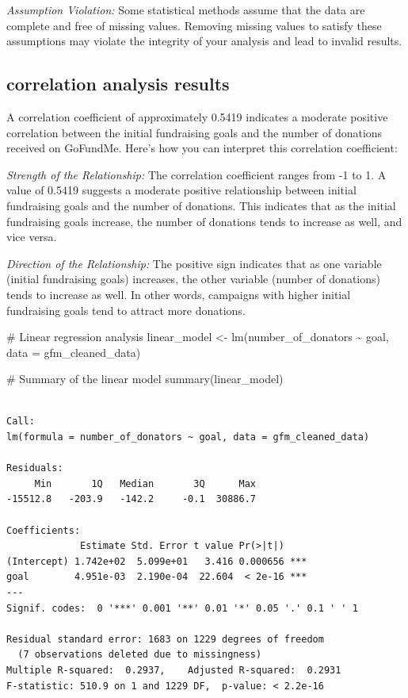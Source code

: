 \documentclass[
  letterpaper,
  DIV=11,
  numbers=noendperiod]{scrartcl}
\newenvironment{Shaded}{\begin{snugshade}}{\end{snugshade}}
\newcommand{\AttributeTok}[1]{\textcolor[rgb]{0.40,0.45,0.13}{#1}}
\newcommand{\CommentTok}[1]{\textcolor[rgb]{0.37,0.37,0.37}{#1}}
\newcommand{\FunctionTok}[1]{\textcolor[rgb]{0.28,0.35,0.67}{#1}}
\newcommand{\NormalTok}[1]{\textcolor[rgb]{0.00,0.23,0.31}{#1}}
\newcommand{\OtherTok}[1]{\textcolor[rgb]{0.00,0.23,0.31}{#1}}
\newcommand{\SpecialCharTok}[1]{\textcolor[rgb]{0.37,0.37,0.37}{#1}}
\begin{document}
\emph{Assumption Violation:} Some statistical methods assume that the
data are complete and free of missing values. Removing missing values to
satisfy these assumptions may violate the integrity of your analysis and
lead to invalid results.

\hypertarget{correlation-analysis-results}{%
\subsection{correlation analysis
results}\label{correlation-analysis-results}}

A correlation coefficient of approximately 0.5419 indicates a moderate
positive correlation between the initial fundraising goals and the
number of donations received on GoFundMe. Here's how you can interpret
this correlation coefficient:

\emph{Strength of the Relationship:} The correlation coefficient ranges
from -1 to 1. A value of 0.5419 suggests a moderate positive
relationship between initial fundraising goals and the number of
donations. This indicates that as the initial fundraising goals
increase, the number of donations tends to increase as well, and vice
versa.

\emph{Direction of the Relationship:} The positive sign indicates that
as one variable (initial fundraising goals) increases, the other
variable (number of donations) tends to increase as well. In other
words, campaigns with higher initial fundraising goals tend to attract
more donations.

\begin{Shaded}
\begin{Highlighting}[]
\CommentTok{\# Linear regression analysis}
\NormalTok{linear\_model }\OtherTok{\textless{}{-}} \FunctionTok{lm}\NormalTok{(number\_of\_donators }\SpecialCharTok{\textasciitilde{}}\NormalTok{ goal, }\AttributeTok{data =}\NormalTok{ gfm\_cleaned\_data)}

\CommentTok{\# Summary of the linear model}
\FunctionTok{summary}\NormalTok{(linear\_model)}
\end{Highlighting}
\end{Shaded}

\begin{verbatim}

Call:
lm(formula = number_of_donators ~ goal, data = gfm_cleaned_data)

Residuals:
     Min       1Q   Median       3Q      Max 
-15512.8   -203.9   -142.2     -0.1  30886.7 

Coefficients:
             Estimate Std. Error t value Pr(>|t|)    
(Intercept) 1.742e+02  5.099e+01   3.416 0.000656 ***
goal        4.951e-03  2.190e-04  22.604  < 2e-16 ***
---
Signif. codes:  0 '***' 0.001 '**' 0.01 '*' 0.05 '.' 0.1 ' ' 1

Residual standard error: 1683 on 1229 degrees of freedom
  (7 observations deleted due to missingness)
Multiple R-squared:  0.2937,    Adjusted R-squared:  0.2931 
F-statistic: 510.9 on 1 and 1229 DF,  p-value: < 2.2e-16
\end{verbatim}
\end{document}

